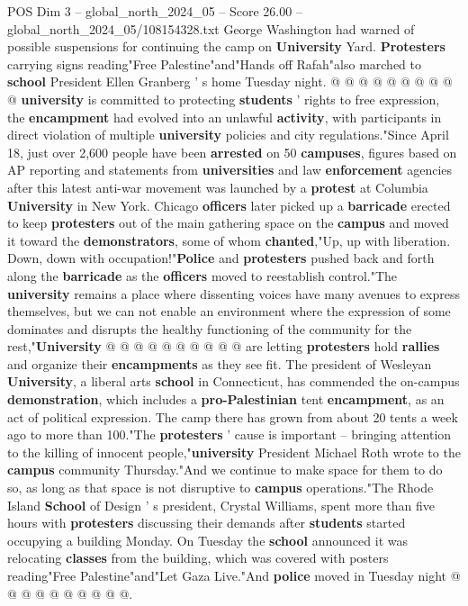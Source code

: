\begin{textsample}{POS Dim 3 – global\_north\_2024\_05 – Score 26.00 – global\_north\_2024\_05/108154328.txt}
George Washington had warned of possible suspensions for continuing the camp on \textbf{University} Yard. \textbf{Protesters} carrying signs reading"Free Palestine"and"Hands off Rafah"also marched to \textbf{school} President Ellen Granberg ' s home Tuesday night. @ @ @ @ @ @ @ @ @ @ \textbf{university} is committed to protecting \textbf{students} ' rights to free expression, the \textbf{encampment} had evolved into an unlawful \textbf{activity}, with participants in direct violation of multiple \textbf{university} policies and city regulations."Since April 18, just over 2,600 people have been \textbf{arrested} on 50 \textbf{campuses}, figures based on AP reporting and statements from \textbf{universities} and law \textbf{enforcement} agencies after this latest anti-war movement was launched by a \textbf{protest} at Columbia \textbf{University} in New York.
Chicago \textbf{officers} later picked up a \textbf{barricade} erected to keep \textbf{protesters} out of the main gathering space on the \textbf{campus} and moved it toward the \textbf{demonstrators}, some of whom \textbf{chanted},"Up, up with liberation.
Down, down with occupation!"\textbf{Police} and \textbf{protesters} pushed back and forth along the \textbf{barricade} as the \textbf{officers} moved to reestablish control."The \textbf{university} remains a place where dissenting voices have many avenues to express themselves, but we can not enable an environment where the expression of some dominates and disrupts the healthy functioning of the community for the rest,"\textbf{University} @ @ @ @ @ @ @ @ @ @ are letting \textbf{protesters} hold \textbf{rallies} and organize their \textbf{encampments} as they see fit.
The president of Wesleyan \textbf{University}, a liberal arts \textbf{school} in Connecticut, has commended the on-campus \textbf{demonstration}, which includes a \textbf{pro-Palestinian} tent \textbf{encampment}, as an act of political expression.
The camp there has grown from about 20 tents a week ago to more than 100."The \textbf{protesters} ' cause is important -- bringing attention to the killing of innocent people,"\textbf{university} President Michael Roth wrote to the \textbf{campus} community Thursday."And we continue to make space for them to do so, as long as that space is not disruptive to \textbf{campus} operations."The Rhode Island \textbf{School} of Design ' s president, Crystal Williams, spent more than five hours with \textbf{protesters} discussing their demands after \textbf{students} started occupying a building Monday.
On Tuesday the \textbf{school} announced it was relocating \textbf{classes} from the building, which was covered with posters reading"Free Palestine"and"Let Gaza Live."And \textbf{police} moved in Tuesday night @ @ @ @ @ @ @ @ @ @.

\end{textsample}
